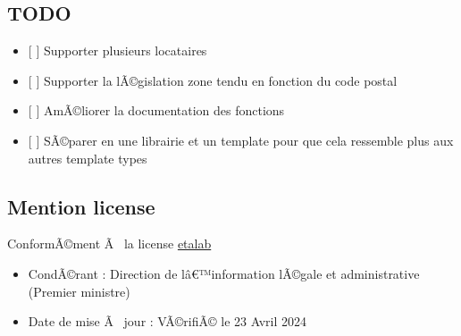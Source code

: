 \begin{Shaded}
\begin{Highlighting}[]
\NormalTok{    )}
\NormalTok{  ),}
\NormalTok{    ),}
\NormalTok{  ),}
\NormalTok{)}
\end{Highlighting}
\end{Shaded}

\subsection{TODO}\label{todo}

\begin{itemize}
\tightlist
\item
  {[} {]} Supporter plusieurs locataires
\item
  {[} {]} Supporter la lÃ©gislation zone tendu en fonction du code
  postal
\item
  {[} {]} AmÃ©liorer la documentation des fonctions
\item
  {[} {]} SÃ©parer en une librairie et un template pour que cela
  ressemble plus aux autres template types
\end{itemize}

\subsection{Mention license}\label{mention-license}

ConformÃ©ment Ã~ la license
\href{https://github.com/etalab/licence-ouverte/blob/master/LO.md}{etalab}

\begin{itemize}
\tightlist
\item
  CondÃ©rant : Direction de lâ€™information lÃ©gale et administrative
  (Premier ministre)
\item
  Date de mise Ã~ jour : VÃ©rifiÃ© le 23 Avril 2024
\end{itemize}

